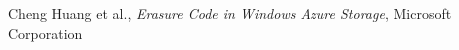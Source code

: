 \documentclass[10pt]{article}
\begin{document}
\begin{thebibliography}{5}

  Cheng Huang et al., \emph{Erasure Code in Windows Azure Storage},
  Microsoft Corporation
\end{thebibliography}










%
%
%
%
%
\end{document}
